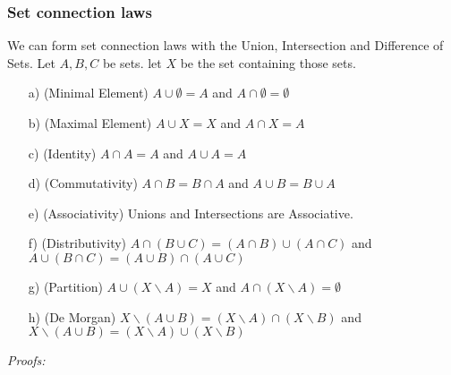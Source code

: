 \subsubsection{Set connection laws}
We can form set connection laws with the Union, Intersection and Difference of Sets. Let $A,B,C$ be sets. let $X$ be the set containing those sets.
\begin{itemize}
	\item [a)](Minimal Element) $A\cup \emptyset = A$ and $A\cap\emptyset = \emptyset$
	\item [b)](Maximal Element) $A\cup X = X$ and $A\cap X = A$
	\item [c)](Identity) $A\cap A = A$ and $A\cup A = A$
	\item [d)](Commutativity) $A\cap B = B\cap A$ and $A\cup B = B\cup A$
	\item [e)](Associativity) Unions and Intersections are Associative.
	\item [f)](Distributivity) $A\cap (B\cup C) = (A\cap B) \cup (A\cap C)$ and $A\cup(B\cap C) = (A\cup B) \cap (A\cup C)$
	\item [g)](Partition) $A\cup (X\backslash A) = X$ and $A\cap(X\backslash A) = \emptyset$
	\item [h)](De Morgan) $X\backslash (A\cup B) = (X\backslash A)\cap(X\backslash B)$ and $X\backslash (A\cup B) = (X\backslash A) \cup (X\backslash B)$
\end{itemize}
\textit{Proofs: }
